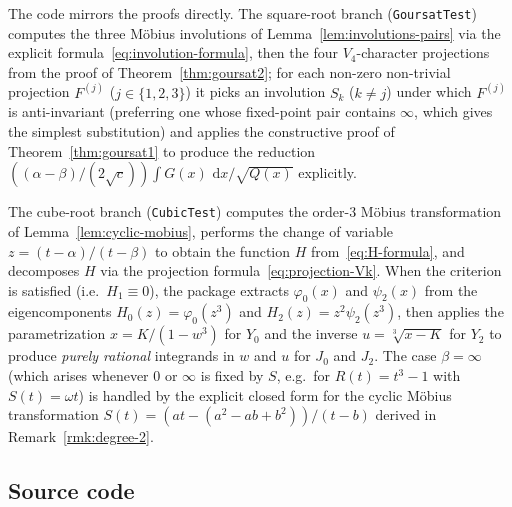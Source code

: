 \documentclass[11pt,a4paper]{article}
\theoremstyle{plain}
\theoremstyle{definition}
\theoremstyle{remark}
\renewcommand{\d}{\,\mathrm{d}}
\begin{document}
The code mirrors the proofs directly. The square-root branch (\texttt{GoursatTest}) computes the three M\"obius involutions of Lemma~\ref{lem:involutions-pairs} via the explicit formula~\eqref{eq:involution-formula}, then the four $V_4$-character projections from the proof of Theorem~\ref{thm:goursat2}; for each non-zero non-trivial projection $F^{(j)}$ ($j\in\{1,2,3\}$) it picks an involution $S_k$ ($k\neq j$) under which $F^{(j)}$ is anti-invariant (preferring one whose fixed-point pair contains $\infty$, which gives the simplest substitution) and applies the constructive proof of Theorem~\ref{thm:goursat1} to produce the reduction $((\alpha-\beta)/(2\sqrt{c}))\int G(x)\,\d x/\sqrt{Q(x)}$ explicitly.

The cube-root branch (\texttt{CubicTest}) computes the order-$3$ M\"obius transformation of Lemma~\ref{lem:cyclic-mobius}, performs the change of variable $z = (t-\alpha)/(t-\beta)$ to obtain the function $H$ from~\eqref{eq:H-formula}, and decomposes $H$ via the projection formula~\eqref{eq:projection-Vk}. When the criterion is satisfied (i.e.\ $H_1\equiv 0$), the package extracts $\varphi_0(x)$ and $\psi_2(x)$ from the eigencomponents $H_0(z)=\varphi_0(z^3)$ and $H_2(z)=z^2\psi_2(z^3)$, then applies the parametrization $x = K/(1-w^3)$ for $Y_0$ and the inverse $u = \sqrt[3]{x-K}$ for $Y_2$ to produce \emph{purely rational} integrands in $w$ and $u$ for $J_0$ and $J_2$. The case $\beta=\infty$ (which arises whenever $0$ or $\infty$ is fixed by $S$, e.g.\ for $R(t)=t^3-1$ with $S(t)=\omega t$) is handled by the explicit closed form for the cyclic M\"obius transformation $S(t)=(at-(a^2-ab+b^2))/(t-b)$ derived in Remark~\ref{rmk:degree-2}.

\subsection*{Source code}
\end{document}
